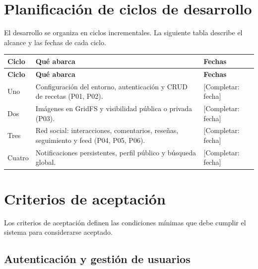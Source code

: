 \documentclass[doc,12pt,a4paper]{apa7}
\begin{document}
\section{Planificación de ciclos de desarrollo}

El desarrollo se organiza en ciclos incrementales. La siguiente tabla describe el alcance y las fechas de cada ciclo.

\begin{longtable}{|P{3.0cm}|L{8.7cm}|P{2.6cm}|}
\hline
\textbf{Ciclo} & \textbf{Qué abarca} & \textbf{Fechas} \\ \hline
\endfirsthead
\hline
\textbf{Ciclo} & \textbf{Qué abarca} & \textbf{Fechas} \\ \hline
\endhead
\hline
\endfoot

Uno & Configuración del entorno, autenticación y CRUD de recetas (P01, P02). & [Completar: fecha] \\ \hline

Dos & Imágenes en GridFS y visibilidad pública o privada (P03). & [Completar: fecha] \\ \hline

Tres & Red social: interacciones, comentarios, reseñas, seguimiento y feed (P04, P05, P06). & [Completar: fecha] \\ \hline

Cuatro & Notificaciones persistentes, perfil público y búsqueda global. & [Completar: fecha] \\ \hline
\end{longtable}

\section{Criterios de aceptación}

Los criterios de aceptación definen las condiciones mínimas que debe cumplir el sistema para considerarse aceptado.

\subsection{Autenticación y gestión de usuarios}
\end{document}
